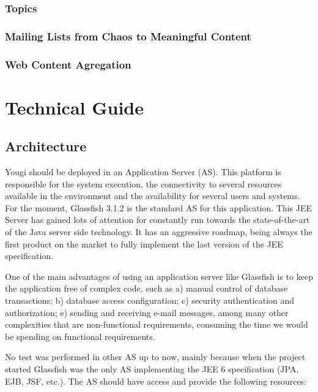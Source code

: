 \documentclass[envcountsame,envcountchap]{svmono}
\begin{document}
\section{Topics}

\section{Mailing Lists from Chaos to Meaningful Content}

\section{Web Content Agregation}

\part{Technical Guide}

\chapter{Architecture}

Yougi should be deployed in an Application Server (AS). This platform is responsible for the system execution, the connectivity to several resources available in the environment and the availability for several users and systems. For the moment, Glassfish 3.1.2 is the standard AS for this application. This JEE Server has gained lots of attention for constantly run towards the state-of-the-art of the Java server side technology. It has an aggressive roadmap, being always the first product on the market to fully implement the last version of the JEE specification.

One of the main advantages of using an application server like Glassfish is to keep the application free of complex code, such as a) manual control of database transactions; b) database access configuration; c) security authentication and authorization; e) sending and receiving e-mail messages, among many other complexities that are non-functional requirements, consuming the time we would be spending on functional requirements.

No test was performed in other AS up to now, mainly because when the project started Glassfish was the only AS implementing the JEE 6 specification (JPA, EJB, JSF, etc.). The AS should have access and provide the following resources:
\end{document}
